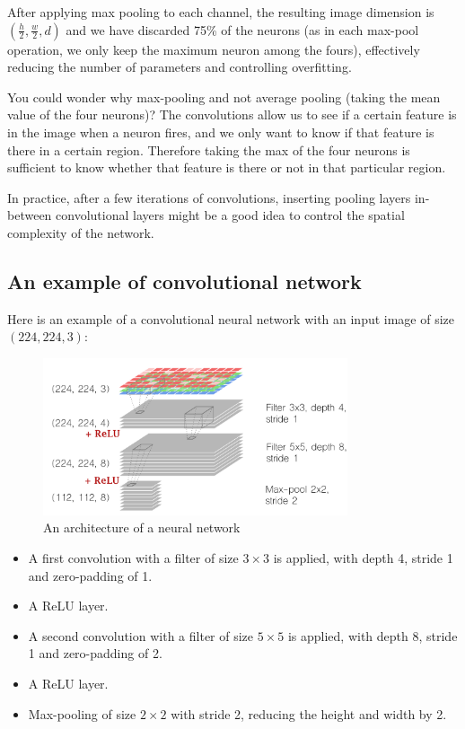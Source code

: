 After applying max pooling to each channel, the resulting image dimension is $(\frac{h}{2}, \frac{w}{2}, d)$ and we have discarded 75\% of the neurons (as in each max-pool operation, we only keep the maximum neuron among the fours), effectively reducing the number of parameters and controlling overfitting.

You could wonder why max-pooling and not average pooling (taking the mean value of the four neurons)? The convolutions allow us to see if a certain feature is in the image when a neuron fires, and we only want to know if that feature is there in a certain region. Therefore taking the max of the four neurons is sufficient to know whether that feature is there or not in that particular region.

In practice, after a few iterations of convolutions, inserting pooling layers in-between convolutional layers might be a good idea to control the spatial complexity of the network.

\subsection{An example of convolutional network}
Here is an example of a convolutional neural network with an input image of size $(224, 224, 3)$:

\begin{figure}[H]
\centering
\includegraphics[width=0.8\textwidth]{Images/conv_archi.png}
\caption{An architecture of a neural network \cite{gorner}}
\end{figure}

\begin{itemize}
\item A first convolution with a filter of size $3\times3$ is applied, with depth 4, stride 1 and zero-padding of 1.
\item A ReLU layer.
\item A second convolution with a filter of size $5\times5$ is applied, with depth 8, stride 1 and zero-padding of 2.
\item A ReLU layer.
\item Max-pooling of size $2\times2$ with stride 2, reducing the height and width by 2.
\end{itemize}


